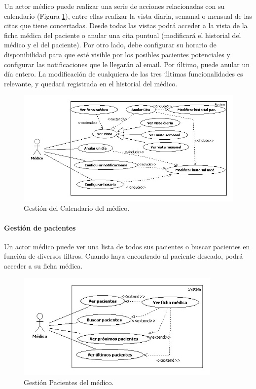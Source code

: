 					Un actor médico puede realizar una serie de acciones relacionadas con su calendario (Figura \ref{fig:cal_med}), entre ellas realizar la vista diaria, semanal o mensual de las citas que tiene concertadas. Desde todas las vistas podrá acceder a la vista de la ficha médica del paciente o anular una cita puntual (modificará el historial del médico y el del paciente). Por otro lado, debe configurar su horario de disponibilidad para que esté visible por los posibles pacientes potenciales y configurar las notificaciones que le llegarán al email. Por último, puede anular un día entero. La modificación de cualquiera de las tres últimas funcionalidades es relevante, y quedará registrada en el historial del médico.
					\begin{figure}[H]
					  \centering
					    \includegraphics[width=14cm]{img/jpg/casos_uso/Gestion_calendario.jpg}
					  \caption{Gestión del Calendario del médico.}
					  \label{fig:cal_med}
					\end{figure}

				\paragraph{Gestión de pacientes} %
				\label{par:gestion_de_pacientes}
					Un actor médico puede ver una lista de todos sus pacientes o buscar pacientes en función de diversos filtros. Cuando haya encontrado al paciente deseado, podrá acceder a su ficha médica.
					\begin{figure}[H]
					  \centering
					    \includegraphics[width=10cm]{img/jpg/casos_uso/Gestion_Pacientes.jpg}
					  \caption{Gestión Pacientes del médico.}
					  \label{fig:pac_med}
					\end{figure}

